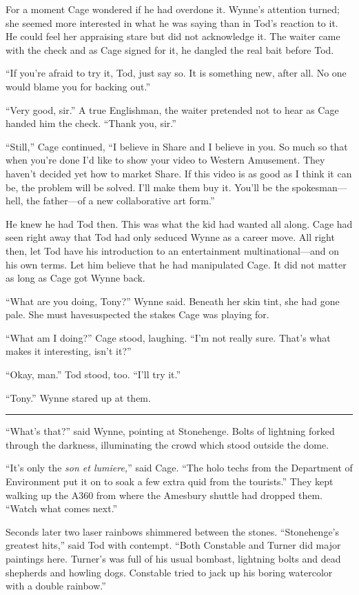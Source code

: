 For a moment Cage wondered if he had overdone it. Wynne's attention turned; she seemed more interested in what he was saying than in Tod's reaction to it. He could feel her appraising stare but did not acknowledge it. The waiter came with the check and as Cage signed for it, he dangled the real bait before Tod.

``If you're afraid to try it, Tod, just say so. It is something new, after all. No one would blame you for backing out.''

``Very good, sir.'' A true Englishman, the waiter pretended not to hear as Cage handed him the check. ``Thank you, sir.''

``Still,'' Cage continued, ``I believe in Share and I believe in you. So much so that when you're done I'd like to show your video to Western Amusement. They haven't decided yet how to market Share. If this video is as good as I think it can be, the problem will be solved. I'll make them buy it. You'll be the spokesman---hell, the father---of a new collaborative art form.''

He knew he had Tod then. This was what the kid had wanted all along. Cage had seen right away that Tod had only seduced Wynne as a career move. All right then, let Tod have his introduction to an entertainment multinational---and on his own terms. Let him believe that he had manipulated Cage. It did not matter as long as Cage got Wynne back.

``What are you doing, Tony?'' Wynne said. Beneath her skin tint, she had gone pale. She must havesuspected the stakes Cage was playing for.

``What am I doing?'' Cage stood, laughing. ``I'm not really sure. That's what makes it interesting, isn't it?''

``Okay, man.'' Tod stood, too. ``I'll try it.''

``Tony.'' Wynne stared up at them.

\fancybreak{* * *}

``What's that?'' said Wynne, pointing at Stonehenge. Bolts of lightning forked through the darkness, illuminating the crowd which stood outside the dome.

``It's only the \textit{son et lumiere,}'' said Cage. ``The holo techs from the Department of Environment put it on to soak a few extra quid from the tourists.'' They kept walking up the A360 from where the Amesbury shuttle had dropped them. ``Watch what comes next.''

Seconds later two laser rainbows shimmered between the stones. ``Stonehenge's greatest hits,'' said Tod with contempt. ``Both Constable and Turner did major paintings here. Turner's was full of his usual bombast, lightning bolts and dead shepherds and howling dogs. Constable tried to jack up his boring watercolor with a double rainbow.''

